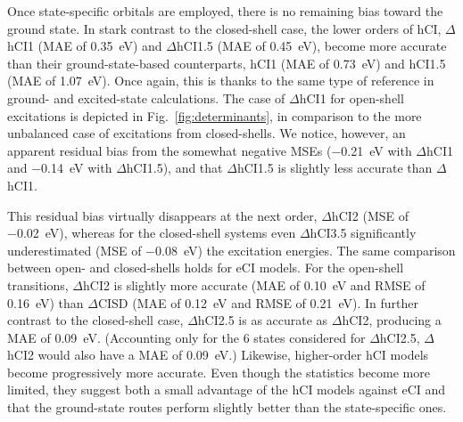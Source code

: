 \documentclass[aip,jcp,reprint,noshowkeys,superscriptaddress]{revtex4-1}
\begin{document}
Once state-specific orbitals are employed, there is no remaining bias toward the ground state.
In stark contrast to the closed-shell case, the lower orders of hCI, $\Delta$hCI1 (MAE of \SI{0.35}{\eV}) and $\Delta$hCI1.5 (MAE of \SI{0.45}{\eV}),
become more accurate than their ground-state-based counterparts, hCI1 (MAE of \SI{0.73}{\eV}) and hCI1.5 (MAE of \SI{1.07}{\eV}).
Once again, this is thanks to the same type of reference in ground- and excited-state calculations.
The case of $\Delta$hCI1 for open-shell excitations is depicted in Fig.~\ref{fig:determinants}, in comparison to the more unbalanced case of excitations from closed-shells.
We notice, however, an apparent residual bias from the somewhat negative MSEs (\SI{-0.21}{\eV} with $\Delta$hCI1 and \SI{-0.14}{\eV} with $\Delta$hCI1.5),
and that $\Delta$hCI1.5 is slightly less accurate than $\Delta$hCI1.

This residual bias virtually disappears at the next order, $\Delta$hCI2 (MSE of \SI{-0.02}{\eV}),
whereas for the closed-shell systems even $\Delta$hCI3.5 significantly underestimated (MSE of \SI{-0.08}{\eV}) the excitation energies.
The same comparison between open- and closed-shells holds for eCI models.
For the open-shell transitions, $\Delta$hCI2 is slightly more accurate (MAE of \SI{0.10}{\eV} and RMSE of \SI{0.16}{\eV}) than $\Delta$CISD (MAE of \SI{0.12}{\eV} and RMSE of \SI{0.21}{\eV}).
In further contrast to the closed-shell case,
$\Delta$hCI2.5 is as accurate as $\Delta$hCI2, producing a MAE of \SI{0.09}{\eV}.
(Accounting only for the 6 states considered for $\Delta$hCI2.5, $\Delta$hCI2 would also have a MAE of \SI{0.09}{\eV}.)
Likewise, higher-order hCI models become progressively more accurate.
Even though the statistics become more limited,
they suggest both a small advantage of the hCI models against eCI
and that the ground-state routes perform slightly better than the state-specific ones.
\end{document}
